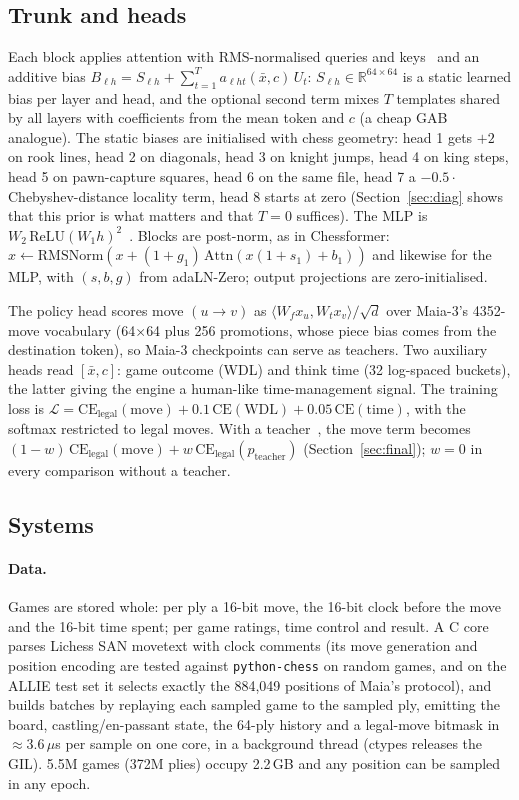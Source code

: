 \subsection{Trunk and heads}
Each block applies attention with RMS-normalised queries and keys~\cite{qknorm} and an additive
bias $B_{\ell h} = S_{\ell h} + \sum_{t=1}^{T} a_{\ell h t}(\bar x, c)\, U_t$: $S_{\ell h}\in\mathbb{R}^{64\times64}$
is a static learned bias per layer and head, and the optional second term mixes $T$ templates shared
by all layers with coefficients from the mean token and $c$ (a cheap GAB analogue). The static
biases are initialised with chess geometry: head 1 gets $+2$ on rook lines, head 2 on diagonals,
head 3 on knight jumps, head 4 on king steps, head 5 on pawn-capture squares, head 6 on the same
file, head 7 a $-0.5\cdot$Chebyshev-distance locality term, head 8 starts at zero
(Section~\ref{sec:diag} shows that this prior is what matters and that $T{=}0$ suffices).
The MLP is $W_2\,\mathrm{ReLU}(W_1 h)^2$~\cite{relu2}. Blocks are post-norm, as in Chessformer:
$x \leftarrow \mathrm{RMSNorm}(x + (1+g_1)\,\mathrm{Attn}(x(1+s_1)+b_1))$ and likewise for the MLP,
with $(s,b,g)$ from adaLN-Zero; output projections are zero-initialised.

The policy head scores move $(u\!\to\!v)$ as $\langle W_f x_u, W_t x_v\rangle/\sqrt d$ over Maia-3's
4352-move vocabulary (64$\times$64 plus 256 promotions, whose piece bias comes from the destination
token), so Maia-3 checkpoints can serve as teachers. Two auxiliary heads read
$[\bar x, c]$: game outcome (WDL) and think time (32 log-spaced buckets), the latter giving the
engine a human-like time-management signal. The training loss is
$\mathcal{L} = \mathrm{CE}_{\text{legal}}(\text{move}) + 0.1\,\mathrm{CE}(\text{WDL}) + 0.05\,\mathrm{CE}(\text{time})$,
with the softmax restricted to legal moves. With a teacher~\cite{hinton}, the move term becomes
$(1-w)\,\mathrm{CE}_{\text{legal}}(\text{move}) + w\,\mathrm{CE}_{\text{legal}}(p_{\text{teacher}})$
(Section~\ref{sec:final}); $w=0$ in every comparison without a teacher.

\subsection{Systems}
\paragraph{Data.} Games are stored whole: per ply a 16-bit move, the 16-bit clock before the move and
the 16-bit time spent; per game ratings, time control and result. A C core parses Lichess SAN
movetext with clock comments (its move generation and position encoding are tested against
\texttt{python-chess} on random games, and on the ALLIE test set it selects exactly the 884,049
positions of Maia's protocol), and builds batches by replaying each sampled game to the sampled ply,
emitting the board, castling/en-passant state, the 64-ply history and a legal-move bitmask in
$\approx$3.6\,$\mu$s per sample on one core, in a background thread (ctypes releases the GIL).
5.5M games (372M plies) occupy 2.2\,GB and any position can be sampled in any epoch.

